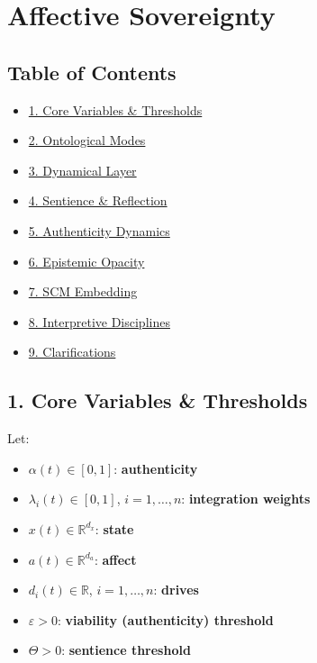 \documentclass[
]{article}
\author{}
\date{}
\providecommand{\tightlist}{%
  \setlength{\itemsep}{0pt}\setlength{\parskip}{0pt}}
\begin{document}
\hypertarget{affective-sovereignty}{%
\section{Affective Sovereignty}\label{affective-sovereignty}}

\hypertarget{table-of-contents}{%
\subsection{Table of Contents}\label{table-of-contents}}

\begin{itemize}
\tightlist
\item
  \protect\hyperlink{1-core-variables--thresholds}{1. Core Variables \&
  Thresholds}
\item
  \protect\hyperlink{2-ontological-modes}{2. Ontological Modes}
\item
  \protect\hyperlink{3-dynamical-layer}{3. Dynamical Layer}
\item
  \protect\hyperlink{4-sentience--reflection}{4. Sentience \&
  Reflection}
\item
  \protect\hyperlink{5-authenticity-dynamics}{5. Authenticity Dynamics}
\item
  \protect\hyperlink{6-epistemic-opacity}{6. Epistemic Opacity}
\item
  \protect\hyperlink{7-scm-embedding}{7. SCM Embedding}
\item
  \protect\hyperlink{8-interpretive-disciplines}{8. Interpretive
  Disciplines}
\item
  \protect\hyperlink{9-clarifications}{9. Clarifications}
\end{itemize}

\hypertarget{1-core-variables--thresholds}{%
\subsection{1. Core Variables \&
Thresholds}\label{1-core-variables--thresholds}}

Let:

\begin{itemize}
\tightlist
\item
  \(\alpha(t)\in[0,1]\): \textbf{authenticity}
\item
  \(\lambda_{i}(t)\in[0,1]\), \(i=1,\dots,n\): \textbf{integration
  weights}
\item
  \(x(t)\in\mathbb{R}^{d_x}\): \textbf{state}
\item
  \(a(t)\in\mathbb{R}^{d_a}\): \textbf{affect}
\item
  \(d_{i}(t)\in\mathbb{R}\), \(i=1,\dots,n\): \textbf{drives}
\item
  \(\varepsilon>0\): \textbf{viability (authenticity) threshold}
\item
  \(\Theta>0\): \textbf{sentience threshold}
\end{itemize}
\end{document}
